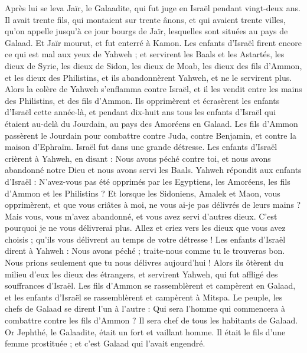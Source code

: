 \begin{multicols}{2}
Après lui se leva Jaïr, le Galaadite, qui fut juge en Israël pendant vingt-deux ans.
Il avait trente fils, qui montaient sur trente ânons, et qui avaient trente villes, qu'on appelle jusqu'à ce jour bourgs de Jaïr, lesquelles sont situées au pays de Galaad.
Et Jaïr mourut, et fut enterré à Kamon.
Les enfants d'Israël firent encore ce qui est mal aux yeux de Yahweh ; et servirent les Baals et les Astartés, les dieux de Syrie, les dieux de Sidon, les dieux de Moab, les dieux des fils d'Ammon, et les dieux des Philistins, et ils abandonnèrent Yahweh, et ne le servirent plus.
Alors la colère de Yahweh s'enflamma contre Israël, et il les vendit entre les mains des Philistins, et des fils d'Ammon.
Ils opprimèrent et écrasèrent les enfants d'Israël cette année-là, et pendant dix-huit ans tous les enfants d'Israël qui étaient au-delà du Jourdain, au pays des Amoréens en Galaad.
Les fils d'Ammon passèrent le Jourdain pour combattre contre Juda, contre Benjamin, et contre la maison d'Ephraïm. Israël fut dans une grande détresse.
Les enfants d'Israël crièrent à Yahweh, en disant : Nous avons péché contre toi, et nous avons abandonné notre Dieu et nous avons servi les Baals.
Yahweh répondit aux enfants d'Israël : N'avez-vous pas été opprimés par les Egyptiens, les Amoréens, les fils d'Ammon et les Philistins ?
Et lorsque les Sidoniens, Amalek et Maon, vous opprimèrent, et que vous criâtes à moi, ne vous ai-je pas délivrés de leurs mains ?
Mais vous, vous m'avez abandonné, et vous avez servi d'autres dieux. C'est pourquoi je ne vous délivrerai plus.
Allez et criez vers les dieux que vous avez choisis ; qu'ils vous délivrent au temps de votre détresse !
Les enfants d'Israël dirent à Yahweh : Nous avons péché ; traite-nous comme tu le trouveras bon. Nous prions seulement que tu nous délivres aujourd'hui !
Alors ils ôtèrent du milieu d'eux les dieux des étrangers, et servirent Yahweh, qui fut affligé des souffrances d'Israël.
Les fils d'Ammon se rassemblèrent et campèrent en Galaad, et les enfants d'Israël se rassemblèrent et campèrent à Mitspa.
Le peuple, les chefs de Galaad se dirent l'un à l'autre : Qui sera l'homme qui commencera à combattre contre les fils d'Ammon ? Il sera chef de tous les habitants de Galaad.
\VerseOne{}Or Jephthé, le Galaadite, était un fort et vaillant homme. Il était le fils d'une femme prostituée ; et c'est Galaad qui l'avait engendré.

\end{multicols}
